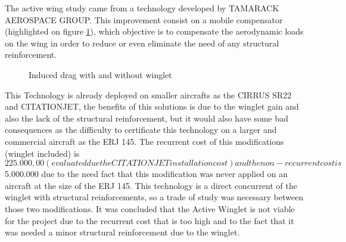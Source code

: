 ﻿The active wing study came from a technology developed by TAMARACK AEROSPACE GROUP. This improvement consist on a mobile compensator (highlighted on figure \ref{fig:ActiveWinglet}), which objective is to compensate the aerodynamic loads on the wing in order to reduce or even eliminate the need of any structural reinforcement.


\begin{figure}[H] %
\caption{Induced drag with and without winglet}
\label{fig:ActiveWinglet}
\end{figure}

This Technology is already deployed on smaller aircrafts as the CIRRUS SR22 and CITATIONJET, the benefits of this solutions is due to the winglet gain and also the lack of the structural reinforcement, but it would also have some bad consequences as the difficulty to certificate this technology on a larger and commercial aircraft as the ERJ 145.
The recurrent cost of this modifications (winglet included) is $ 225.000,00 (evaluated due the CITATIONJET installation cost) and  the non-recurrent cost is $ 5.000.000 due to the need fact that this modification was never applied on an aircraft at the size of the ERJ 145.
This technology is a direct concurrent of the winglet with structural reinforcements, so a trade of study was necessary between those two modifications. It was concluded that the Active Winglet is not viable for the project due to the recurrent cost that is too high and to the fact that it was needed a minor structural reinforcement due to the winglet.

